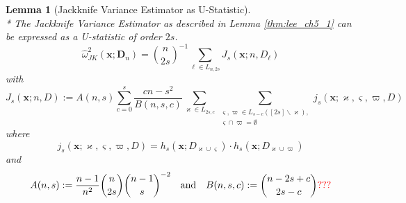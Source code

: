 \documentclass[letterpaper,10pt]{article}
\numberwithin{equation}{section}
\numberwithin{thm}{section}
\newtheorem{lem}{Lemma}
\numberwithin{lem}{section}
\numberwithin{cor}{section}
\renewcommand{\hat}{\widehat}
\newcommand{\1}{\mathbbm{1}}
\begin{document}
\begin{lem}[Jackknife Variance Estimator as U-Statistic]\label{JK_as_U_Stat}\mbox{}\\*
	The Jackknife Variance Estimator as described in Lemma \ref{thm:lee_ch5_1} can be expressed as a U-statistic of order $2s$.
	\begin{equation}
		\hat{\omega}^{2}_{JK}\left(\mathbf{x}; \mathbf{D}_n\right)
		= \binom{n}{2s}^{-1} \sum_{\ell \in L_{n, 2 s}}J_{s}\left(\mathbf{x}; n, D_\ell\right)
	\end{equation}
	with
	\begin{equation}
		J_{s}\left(\mathbf{x}; n, D\right)
		:= A(n, s)
		\sum_{c = 0}^{s} \frac{cn - s^2}{B(n, s, c)}
		\sum_{\varkappa \in L_{2 s, c}}
		\sum_{\substack{\varsigma, \varpi \in L_{s - c}([2 s] \backslash \varkappa),\\
				\varsigma \cap \varpi = \emptyset}}
		j_{s}\left(\mathbf{x}; \varkappa, \varsigma, \varpi, D\right)
	\end{equation}
	where
	\begin{equation}
		j_{s}\left(\mathbf{x}; \varkappa, \varsigma, \varpi, D\right) =
		h_{s}(\mathbf{x}; D_{\varkappa \cup \varsigma}) \cdot
		h_{s}(\mathbf{x};D_{\varkappa \cup \varpi})
	\end{equation}
	and
	\begin{equation}
		A(n, s) := \frac{n-1}{n^2} \binom{n}{2s} \binom{n-1}{s}^{-2}
		\quad \text{and} \quad
		B(n, s, c) := \binom{n-2s+c}{2s - c}{\color{red} \text{???}}
	\end{equation}
\end{lem}
\end{document}
